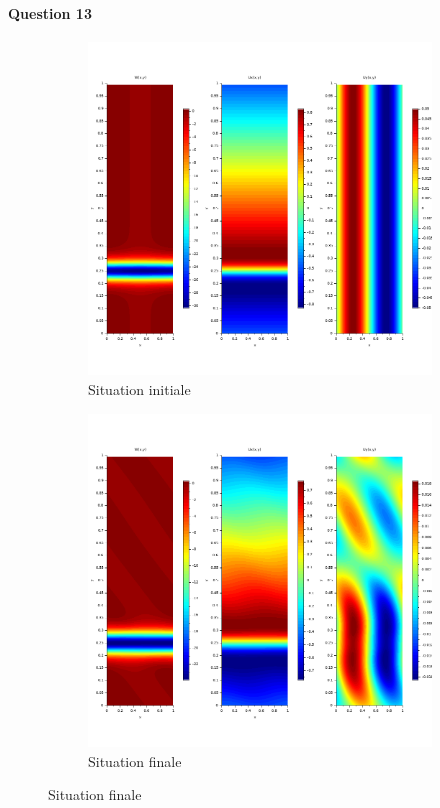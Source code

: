 \documentclass{article}
\begin{document}
\paragraph{Question 13}
\begin{figure}
	\centering
	\begin{subfigure}{0.3\textwidth}
		\includegraphics[width=\textwidth]{start_simu_1.png}
		\caption{Situation initiale}
	\end{subfigure}
	\begin{subfigure}{0.3\textwidth}
		\includegraphics[width=\textwidth]{end_simu_1.png}
		\caption{Situation finale}
	\end{subfigure}


\end{figure}
\end{document}
